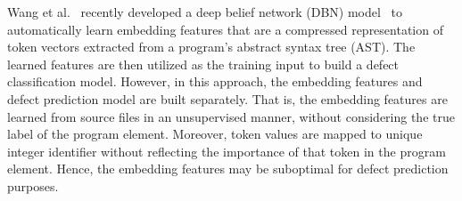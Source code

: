 Wang et al.~\cite{wang2016automatically} recently developed a deep belief network (DBN) model~\cite{hinton2009deep} to automatically learn embedding features that are a compressed representation of token vectors extracted from a program's abstract syntax tree (AST). The learned features are then utilized as the training input to build a defect classification model. However, in this approach, the embedding features and defect prediction model are built separately.
That is, the embedding features are learned from source files in an unsupervised manner, without considering the true label of the program element. Moreover, token values are mapped to unique integer identifier without reflecting the importance of that token in the program element. Hence, the embedding features may be suboptimal for defect prediction purposes. 

